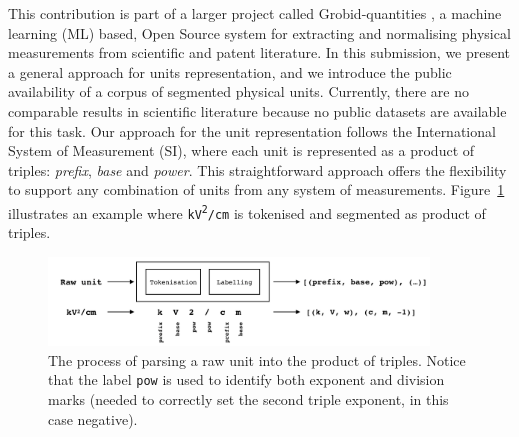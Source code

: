 \documentclass[a4,11pt]{article}
\begin{document}
This contribution is part of a larger project called Grobid-quantities \autocite{grobid-quantities}, a machine learning (ML) based, Open Source system for extracting and normalising physical measurements from scientific and patent literature. 
In this submission, we present a general approach for units representation, and we introduce the public availability of a corpus of segmented physical units. 
Currently, there are no comparable results in scientific literature because no public datasets are available for this task.
Our approach for the unit representation follows the International System of Measurement (SI), where each unit is represented as a product of triples: \textit{prefix}, \textit{base} and \textit{power}. This straightforward approach offers the flexibility to support any combination of units from any system of measurements. 
Figure~\ref{fig:dataset example} illustrates an example where \texttt{kV\textsuperscript{2}/cm} is tokenised and segmented as product of triples.
\begin{figure}[h]
    \centering
    \includegraphics[width=0.9\textwidth,natwidth=527,natheight=124]{system-schema.png}
    \caption[] {The process of parsing a raw unit into the product of triples. Notice that the label \texttt{pow} is used to identify both exponent and division marks (needed to correctly set the second triple exponent, in this case negative).}
    \label{fig:dataset example}
\end{figure}
\end{document}
